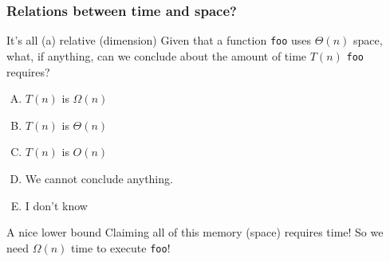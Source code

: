\begin{frame}
	\frametitle{Relations between time and space?}
	\begin{questionblock}{It's all (a) relative (dimension)}
		Given that a function \texttt{foo} uses $\Theta(n)$ space, what, if anything, can we conclude about the amount of
		time $T(n)$ \texttt{foo} requires?
		\begin{enumerate}[A.]
			\item $T(n)$ is $\Omega(n)$
			\item $T(n)$ is $\Theta(n)$
			\item $T(n)$ is $O(n)$
			\item We cannot conclude anything.
			\item I don't know
		\end{enumerate}
	\end{questionblock}
		\pause
		\begin{answerblock}{A nice lower bound}
			Claiming all of this memory (space) requires time! So we need $\Omega(n)$ time to execute \texttt{foo}!
		\end{answerblock}
\end{frame}
